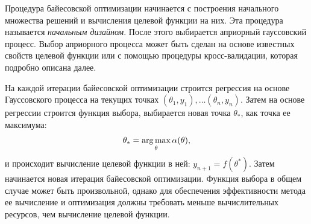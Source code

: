 Процедура байесовской оптимизации начинается с построения начального множества решений и вычисления целевой функции на них.
Эта процедура называется \textit{начальным дизайном}.
После этого выбирается априорный гауссовский процесс.%
Выбор априорного процесса может быть сделан на основе известных свойств целевой функции или с помощью процедуры кросс-валидации, которая подробно описана далее.%

На каждой итерации байесовской оптимизации строится регрессия на основе Гауссовского процесса на текущих точках $(\theta_1, y_1),\dots(\theta_n, y_n)$.
Затем на основе регрессии строится функция выбора, выбирается новая точка $\theta_*$, как точка ее максимума:
\[
\theta_* = \operatorname*{arg\,max}_{\theta} \alpha(\theta),
\]
и происходит вычисление целевой функции в ней: $y_{n+1} = f(\theta^*)$.
Затем начинается новая итерация байесовской оптимизации.
Функция выбора в общем случае может быть произвольной, однако для обеспечения эффективности метода ее вычисление и оптимизация должны требовать меньше вычислительных ресурсов, чем вычисление целевой функции.

